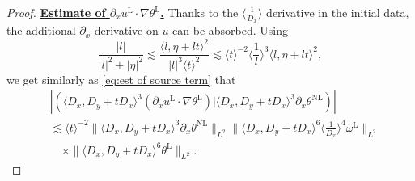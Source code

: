 \documentclass[reqno, 12pt]{amsart} %
\theoremstyle{plain} %
\theoremstyle{definition}
\theoremstyle{remark}
\numberwithin{equation}{section} %
\newcommand{\no}{\nonumber}
\newcommand{\px}{\partial_x}
\begin{document}
\begin{proof}
		
		\underline{\bf Estimate of $\px u^{\mathrm{L}} \cdot \nabla  \theta^{\mathrm{L}}$.} Thanks to the $\langle \frac{1}{D_x}\rangle$ derivative in the initial data, the additional $\px$ derivative on $u$ can be absorbed.
		Using
		$$
		\frac{|l|}{|l|^2+|\eta|^2}  \lesssim \frac{\langle l, \eta+l t\rangle^2}{|l|^3\langle t\rangle^2} \lesssim\langle t\rangle^{-2}\langle\frac{1}{l}\rangle^3\langle l, \eta+l t\rangle^2,
		$$
		we get similarly as \eqref{eq:est of source term} that
		\begin{align} \label{eq:3}
			&\no \left|\left(\langle D_x, D_y+t D_x\rangle^3( \px u^{\mathrm{L}} \cdot \nabla \theta^{\mathrm{L}}) \big| \langle D_x, D_y+t D_x\rangle^3 \px\theta^{\mathrm{NL}}\right)\right| \\
			&\no \lesssim\langle t\rangle^{-2}\|\langle D_x, D_y+t D_x\rangle^3 \px\theta^{\mathrm{NL}}\|_{L^2}\|\langle D_x, D_y+t D_x\rangle^6\langle\frac{1}{D_x}\rangle^4 \omega^{\mathrm{L}}\|_{L^2} \\
			& \quad \times\|\langle D_x, D_y+t D_x\rangle^6 \theta^{\mathrm{L}}\|_{L^2} .
		\end{align}
		

\end{proof}
\end{document}
